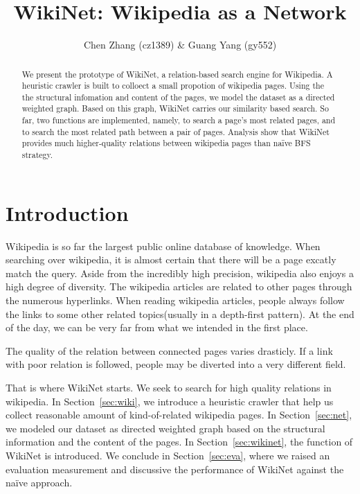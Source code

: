 \documentclass[12pt]{amsart}
\title{WikiNet: Wikipedia as a Network}
\author{Chen Zhang (cz1389) \& Guang Yang (gy552)}
\newcommand{\0}{\mat{0}}
\newcommand{\1}{\mathds{1}}
\begin{document}
\begin{abstract}
We present the prototype of WikiNet, a relation-based search engine for Wikipedia. A heuristic crawler is built to colloect a small propotion of wikipedia pages. Using the the structural infomation and content of the pages, we model the dataset as a directed weighted graph. Based on this graph, WikiNet carries our similarity based search. So far, two functions are implemented, namely, to search a page's most related pages, and to search the  most related path between a pair of pages. Analysis show that WikiNet provides much higher-quality relations between wikipedia pages than na\"ive BFS strategy. 
\end{abstract}

\maketitle

\section{Introduction}

Wikipedia is so far the largest public online database of knowledge. 
When searching over wikipedia, it is almost certain that there will be a page excatly match the query. 
Aside from the incredibly high precision, wikipedia also enjoys a high degree of diversity. The wikipedia articles are related to other pages through the numerous hyperlinks. 
When reading wikipedia articles, people always follow the links to some other related topics(usually in a depth-first pattern). 
At the end of the day, we can be very far from what we intended in the first place. 

The quality of the relation between connected pages varies drasticly. If a link with poor relation is followed, people may be diverted into a very different field. 

That is where WikiNet starts. We seek to search for high quality relations in wikipedia. 
In Section~\ref{sec:wiki}, we introduce a heuristic crawler that help us collect reasonable amount of kind-of-related wikipedia pages. 
In Section~\ref{sec:net}, we modeled our dataset as directed weighted graph based on the structural information and the content of the pages. 
In Section~\ref{sec:wikinet}, the function of WikiNet is introduced. 
We conclude in Section~\ref{sec:eva}, where we raised an evaluation measurement and discussive the performance of WikiNet against the na\"ive approach. 
\end{document}
